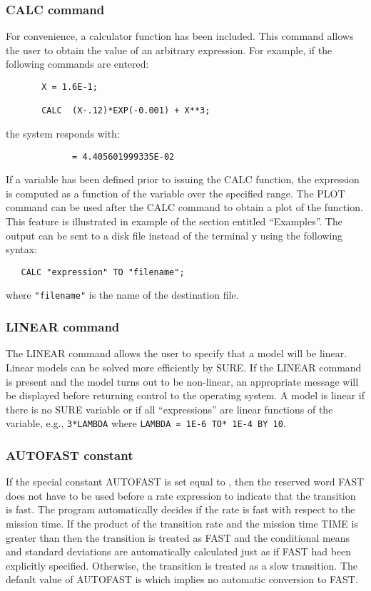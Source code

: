 \subsubsection{CALC command} For convenience, a calculator function
 has been included.  This command allows the user to obtain the value of an
 arbitrary expression.  For example, if the following commands are entered:
\begin{verbatim}
       X = 1.6E-1;

       CALC  (X-.12)*EXP(-0.001) + X**3;
\end{verbatim}
the system responds with:
\begin{verbatim}
             = 4.405601999335E-02
\end{verbatim}
If a variable has been defined prior to issuing the {\isf CALC} function, the
expression is computed as a function of the variable over the specified range.
The {\isf PLOT} command can be used after the {\isf CALC} command to obtain a
plot of the function.  This feature is illustrated in example {} of the
section entitled ``Examples''.  The output can be sent to a disk file instead
of the terminal y using the following syntax:
\begin{verbatim}
   CALC "expression" TO "filename";
\end{verbatim}
where \verb|"filename"| is the name of the destination file.

\subsubsection{LINEAR command}
The {\isf LINEAR} command allows the user to specify that a model will be linear.
Linear models can be solved more efficiently by SURE.  If the
{\isf LINEAR} command is present and the model turns out to be non-linear, an
appropriate message will be displayed before returning control to the
operating system.  A model is linear if there is no SURE variable or if all
``expressions'' are linear functions of the variable, e.g., 
\verb|3*LAMBDA| where \verb|LAMBDA = 1E-6 TO* 1E-4 BY 10|.
\subsubsection{AUTOFAST constant} If the
special constant {\isf AUTOFAST} is set equal to {}, then the reserved
word {\isf FAST} does not have to be used before a rate expression to indicate
that the transition is fast.  The program automatically decides if the rate is
fast with respect to the mission time.  If the product of the transition rate
and the mission time {\isf TIME} is greater than {} then the
transition is treated as {\isf FAST} and the conditional means and standard
deviations are automatically calculated just as if {\isf FAST} had been
explicitly specified.  Otherwise, the transition is treated as a slow
transition.  The default value of {\isf AUTOFAST} is {} which implies no
automatic conversion to {\isf FAST}.



